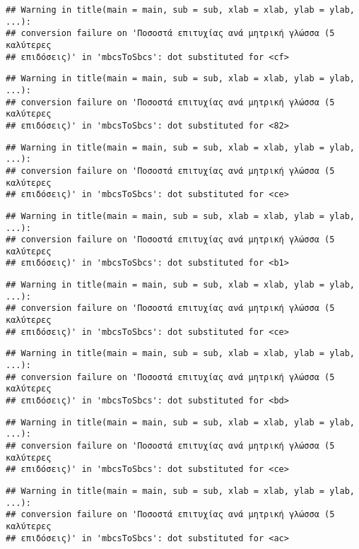 \documentclass[
]{article}
\begin{document}
\begin{verbatim}
## Warning in title(main = main, sub = sub, xlab = xlab, ylab = ylab, ...):
## conversion failure on 'Ποσοστά επιτυχίας ανά μητρική γλώσσα (5 καλύτερες
## επιδόσεις)' in 'mbcsToSbcs': dot substituted for <cf>
\end{verbatim}

\begin{verbatim}
## Warning in title(main = main, sub = sub, xlab = xlab, ylab = ylab, ...):
## conversion failure on 'Ποσοστά επιτυχίας ανά μητρική γλώσσα (5 καλύτερες
## επιδόσεις)' in 'mbcsToSbcs': dot substituted for <82>
\end{verbatim}

\begin{verbatim}
## Warning in title(main = main, sub = sub, xlab = xlab, ylab = ylab, ...):
## conversion failure on 'Ποσοστά επιτυχίας ανά μητρική γλώσσα (5 καλύτερες
## επιδόσεις)' in 'mbcsToSbcs': dot substituted for <ce>
\end{verbatim}

\begin{verbatim}
## Warning in title(main = main, sub = sub, xlab = xlab, ylab = ylab, ...):
## conversion failure on 'Ποσοστά επιτυχίας ανά μητρική γλώσσα (5 καλύτερες
## επιδόσεις)' in 'mbcsToSbcs': dot substituted for <b1>
\end{verbatim}

\begin{verbatim}
## Warning in title(main = main, sub = sub, xlab = xlab, ylab = ylab, ...):
## conversion failure on 'Ποσοστά επιτυχίας ανά μητρική γλώσσα (5 καλύτερες
## επιδόσεις)' in 'mbcsToSbcs': dot substituted for <ce>
\end{verbatim}

\begin{verbatim}
## Warning in title(main = main, sub = sub, xlab = xlab, ylab = ylab, ...):
## conversion failure on 'Ποσοστά επιτυχίας ανά μητρική γλώσσα (5 καλύτερες
## επιδόσεις)' in 'mbcsToSbcs': dot substituted for <bd>
\end{verbatim}

\begin{verbatim}
## Warning in title(main = main, sub = sub, xlab = xlab, ylab = ylab, ...):
## conversion failure on 'Ποσοστά επιτυχίας ανά μητρική γλώσσα (5 καλύτερες
## επιδόσεις)' in 'mbcsToSbcs': dot substituted for <ce>
\end{verbatim}

\begin{verbatim}
## Warning in title(main = main, sub = sub, xlab = xlab, ylab = ylab, ...):
## conversion failure on 'Ποσοστά επιτυχίας ανά μητρική γλώσσα (5 καλύτερες
## επιδόσεις)' in 'mbcsToSbcs': dot substituted for <ac>
\end{verbatim}
\end{document}
